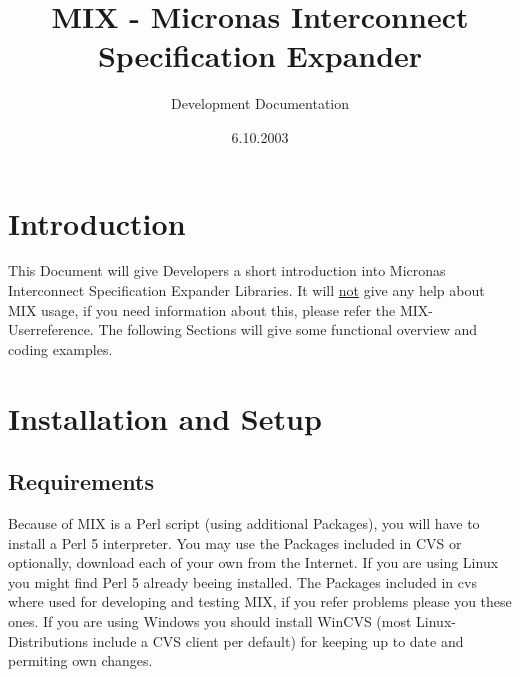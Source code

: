 \documentclass[a4paper,12pt]{article}
\title{MIX - Micronas Interconnect Specification Expander}
\author{Development Documentation}
\date{6.10.2003}
\begin{document}

\maketitle
\newpage

\tableofcontents
\newpage

\section{Introduction}
This Document will give Developers a short introduction into Micronas Interconnect Specification Expander Libraries. It will \underline{not} give any help about MIX usage, if you need information about this, please refer the MIX-Userreference. The following Sections will give some functional overview and coding examples.

\section{Installation and Setup}
\subsection{Requirements}
Because of MIX is a Perl script (using additional Packages), you will have to install a Perl 5 interpreter. You may use the Packages included in CVS or optionally, download each of your own from the Internet. If you are using Linux you might find Perl 5 already beeing installed. The Packages included in cvs where used for developing and testing MIX, if you refer problems please you these ones. If you are using Windows you should install WinCVS (most Linux-Distributions include a CVS client per default) for keeping up to date and permiting own changes.
\end{document}
